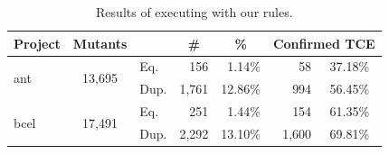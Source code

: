 \scriptsize
\begin{table}[t]
\centering
\caption{Results of executing \mujava{} with our rules.}
\label{tab:real-practice-subjects}
\begin{tabular}{|l|c|l|r|r|r|c|}
\hline
\multicolumn{1}{|c|}{\textbf{Project}} & \textbf{Mutants}        & \multicolumn{1}{c|}{\textbf{}} & \multicolumn{1}{c|}{\textbf{\#}} & \multicolumn{1}{c|}{\textbf{\%}} & \multicolumn{2}{c|}{\textbf{Confirmed TCE}} \\ \hline
\multirow{2}{*}{ant}                   & \multirow{2}{*}{13,695}  & Eq.                    & 156                              & 1.14\%                           & 58                   & 37.18\%                 \\ \cline{3-7} 
                                       &                         & Dup.                     & 1,761                             & 12.86\%                          & 994                  & 56.45\%                 \\ \hline
\multirow{2}{*}{bcel}                  & \multirow{2}{*}{17,491}  & Eq.                    & 251                              & 1.44\%                           & 154                  & 61.35\%                 \\ \cline{3-7} 
                                       &                         & Dup.                     & 2,292                             & 13.10\%                          & 1,600                 & 69.81\%                 \\ \hline


\end{tabular}
\end{table}
